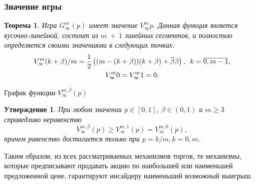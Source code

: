 \documentclass[12pt]{beamer}
\newcommand{\Co}{\beta}
\newcommand{\DCo}{\overline{\beta}}
\newtheorem{thm}{Теорема}[section]
\newtheorem{prop}{Утверждение}[section]
\begin{document}
\begin{frame}
  \frametitle{Значение игры}

  \begin{thm}
    Игра $G^m_\infty(p)$ имеет значение $V^m_\infty{p}$. Данная функция является кусочно-линейной, состоит из $m~+~1$ линейных сегментов, и полностью определяется своими значениями в следующих точках:
    \begin{gather*}
      V^m_\infty{(k+\Co)/m} = \frac{1}{2} \left( (m - (k + \Co))(k + \Co) + \DCo\Co
      \right),\enskip
      k = \overline{0, m - 1},\\
      V^m_\infty{0} = V^m_\infty{1} = 0.
    \end{gather*}
  \end{thm}
\end{frame}

\begin{frame}
  \begin{figure}[thb]
    \centering
  \end{figure}

  \begin{center}
    График функции $V^{m,\Co}_\infty(p)$
  \end{center}
\end{frame}

\begin{frame}
  \begin{prop}
    При любом значении $p \in [0,1]$, $\Co \in (0,1)$ и $m \geq 3$ справедливо неравенство
    \begin{equation*}
      V^{m, \Co}_\infty(p) \geq V^{m,1}_\infty(p) = V^{m,0}_\infty(p),
    \end{equation*}
    причем равенство достигается только при $p = k/m, k = \overline{0,m}$.
  \end{prop}

  Таким образом, из всех рассматриваемых механизмов торгов, те механизмы, которые предписывают продавать акцию по наибольшей или наименьшей предложенной цене, гарантируют инсайдеру наименьший возможный выигрыш.
\end{frame}
\end{document}
